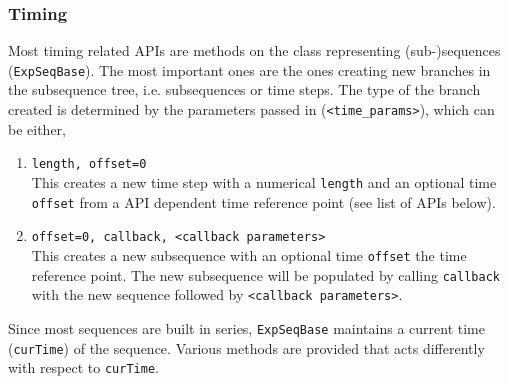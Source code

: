 \subsubsection{Timing}
Most timing related APIs are methods on the class representing (sub-)sequences
(\verb`ExpSeqBase`). The most important ones are the ones creating new branches
in the subsequence tree, i.e. subsequences or time steps.
The type of the branch created is determined by the parameters passed in
(\verb`<time_params>`), which can be either,
\begin{enumerate}
\item \verb`length, offset=0`\\
  This creates a new time step with a numerical \verb`length`
  and an optional time \verb`offset` from a API dependent time reference point
  (see list of APIs below).
\item \verb`offset=0, callback, <callback parameters>`\\
  This creates a new subsequence with an optional time \verb`offset` the time reference point.
  The new subsequence will be populated by calling \verb`callback`
  with the new sequence followed by \verb`<callback parameters>`.
\end{enumerate}
Since most sequences are built in series, \verb`ExpSeqBase` maintains
a current time (\verb`curTime`) of the sequence.
Various methods are provided that acts differently with respect to \verb`curTime`.
